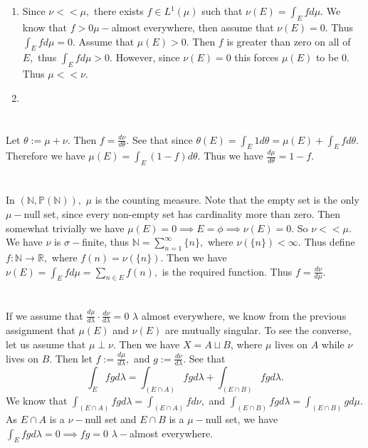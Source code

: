 \documentclass{article}
\begin{document}
\section{} %
\begin{enumerate}
	\item Since $\nu << \mu,$ there exists $f \in L^1(\mu)$ such that $\nu(E)=\int_E f d\mu.$ We know that $f>0 \mu-$almost everywhere, then assume that 
	$\nu(E)=0.$ Thus $\int_{E}f d\mu=0.$ Assume that $\mu(E)>0.$ Then $f$ is greater than zero on all of $E,$ thus $\int_E f d\mu > 0.$ However, since 
	$\nu(E)=0$ this forces $\mu(E)$ to be $0.$ Thus $\mu << \nu.$
	
	\item 
\end{enumerate}
\section{} %
Let $\theta:= \mu + \nu.$ Then $f=\frac{d\nu}{d\theta}.$ See that since $\theta(E)=\int_{E}1 d\theta= \mu(E)+ \int_{E} f d\theta.$ Therefore we have 
$\mu(E)=\int_{E}(1-f)d\theta.$ Thus we have $\frac{d\mu}{d\theta}=1-f.$  
\section{} %
In $(\mathbb{N},\mathbb{P(N)}),$ $\mu$ is the counting measure. Note that the empty set is the only $\mu-$null set, since every non-empty set has 
cardinality more than zero. Then somewhat trivially we have $\mu(E)=0 \implies E=\phi \implies \nu(E)=0.$ So $\nu << \mu.$ We have $\nu$ is $\sigma-$finite, 
thus $\mathbb{N}=\sum_{n=1}^{\infty}\{n\},$ where $\nu(\{n\})<\infty.$ Thus define $f: \mathbb{N} \rightarrow \mathbb{R},$ where $f(n)=\nu(\{n\}).$ Then we 
have $\nu(E)=\int_E f d\mu=\sum_{n \in E}f(n),$ is the required function. Thus $f=\frac{d\nu}{d\mu}.$
\section{} %
If we assume that $\frac{d\mu}{d\lambda}\cdot \frac{d\nu}{d\lambda}=0$ $\lambda$ almost everywhere, we know from the previous assignment that $\mu(E)$ and 
$\nu(E)$ are mutually singular. To see the converse, let us assume that $\mu \perp \nu.$ Then we have $X=A \sqcup B$, where $\mu$ lives on $A$ while $\nu$ 
lives on $B.$ Then let $f:= \frac{d\mu}{d\lambda},$ and $g:=\frac{d\nu}{d\lambda}.$ See that $$\int_{E}fg d\lambda=\int_{(E\cap A)}fg d\lambda + 
\int_{(E\cap B)} fg d\lambda.$$ We know that $ \int_{(E\cap A)}fg d\lambda=\int_{(E\cap A)}f d\nu,$ and $ \int_{(E\cap B)}fg d\lambda=\int_{(E\cap B)}g 
d\mu.$ As $E \cap A$ is a $ \nu-$null set and $E \cap B$ is a $\mu-$null set, we have  $\int_{E}fg d\lambda=0 \implies fg=0$  $\lambda-$almost everywhere.
\end{document}
